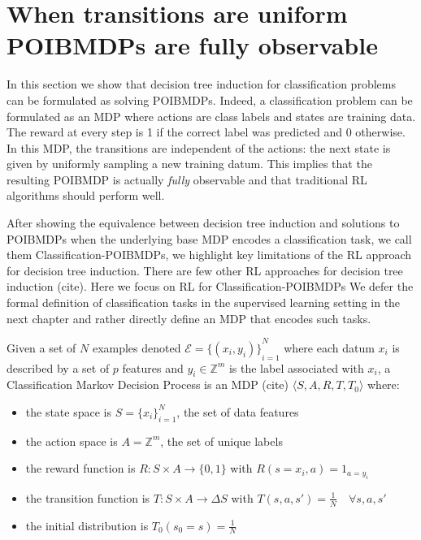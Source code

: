 \chapter{When transitions are uniform POIBMDPs are fully observable}
In this section we show that decision tree induction for classification problems can be formulated as solving POIBMDPs.
Indeed, a classification problem can be formulated as an MDP where actions are class labels and states are training data.
The reward at every step is 1 if the correct label was predicted and 0 otherwise.
In this MDP, the transitions are independent of the actions: the next state is given by uniformly sampling a new training datum. 
This implies that the resulting POIBMDP is actually \textit{fully} observable and that traditional RL algorithms should perform well.

After showing the equivalence between decision tree induction and solutions to POIBMDPs when the underlying base MDP encodes a classification task, we call them Classification-POIBMDPs, we highlight key limitations of the RL approach for decision tree induction.
There are few other RL approaches for decision tree induction (cite). Here we focus on RL for Classification-POIBMDPs
We defer the formal definition of classification tasks in the supervised learning setting in the next chapter and rather directly define an MDP that encodes such tasks. 
\begin{definition}
    Given a set of $N$ examples denoted $\mathcal{E} = {\{(x_i, y_i)\}}_{i=1}^N$ where each datum $x_i$ is described by a set of $p$ features and $y_i \in \mathbb{Z}^m$ is the label associated with $x_i$, a Classification Markov Decision Process is an MDP (cite) $\langle S, A, R, T, T_0 \rangle$ where:
    \begin{itemize}
        \item the state space is $S={\{x_i\}}_{i=1}^N$, the set of data features
        \item the action space is $A=\mathbb{Z}^m$, the set of unique labels
        \item the reward function is $R:S\times A \rightarrow \{0, 1\}$ with $R(s=x_i, a) = 1_{a=y_i}$
        \item the transition function is $T:S\times A \rightarrow \Delta S$ with $T(s, a, s') = \frac{1}{N} \quad \forall s, a, s'$
        \item the initial distribution is $T_0(s_0 = s) = \frac{1}{N}$
    \end{itemize}
\end{definition}

